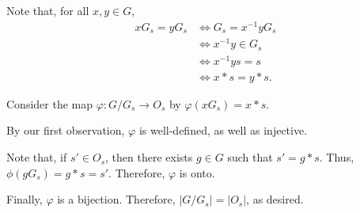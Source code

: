 
\begin{dem}{}{}
  Note that, for all \(x, y \in G\), 
  \begin{align*}
    xG_s = yG_s &\iff G_s = x^{-1}yG_s \\
                &\iff x^{-1}y \in G_s \\
                &\iff x^{-1}ys = s \\
                &\iff x*s = y*s.
  \end{align*}

  Consider the map \(\varphi \colon G/G_s \to O_s\) by \(\varphi(xG_s) = x*s\).

  By our first observation, \(\varphi\) is well-defined, as well as injective.

  Note that, if \(s' \in O_s\), then there exists \(g \in G\) such that \(s' = g * s\). Thus, \(\phi(gG_s) = g*s = s'\). Therefore, \(\varphi\) is onto.

  Finally, \(\varphi\) is a bijection. Therefore, \(|G/G_s| = |O_s|\), as desired.
\end{dem}
